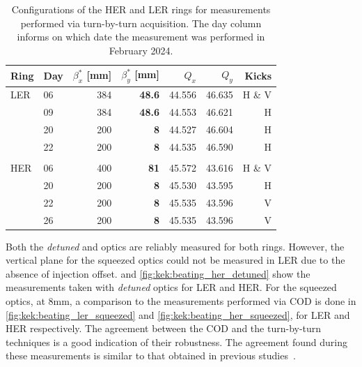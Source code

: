 \begin{table}
    \centering
    \begin{tabular}{llrrrrr}
    \hline
    Ring & Day & $\beta_x^*$ [mm] & $\beta_y^*$ [mm] & $Q_x$ & $Q_y$ & Kicks\\
    \hline
    LER        & 06 & 384 &\textbf{48.6} & 44.556 & 46.635 & H \& V \\
               & 09 & 384 &\textbf{48.6} & 44.553 & 46.621 & H  \\
               \hdashline
               & 20 & 200 & \textbf{8}   & 44.527 & 46.604 & H \\
               & 22 & 200 & \textbf{8}   & 44.535 & 46.590 & H \\
               &&&&&& \\
    HER        & 06 & 400 & \textbf{81}  & 45.572 & 43.616 & H \& V\\
               \hdashline
               & 20 & 200 & \textbf{8} & 45.530 & 43.595 & H \\
               & 22 & 200 & \textbf{8} & 45.535 & 43.596 & V \\
               & 26 & 200 & \textbf{8} & 45.535 & 43.596 & V \\
    \bottomrule
    \end{tabular}
  \caption{Configurations of the HER and LER rings for measurements performed via turn-by-turn
  acquisition. The day column informs on which date the measurement was performed in February 2024.}
  \label{tab:superkekb:configurations}
\end{table}

Both the \textit{detuned} and  optics are reliably measured for
both rings. However, the vertical plane for the squeezed optics could not be measured
in LER due to the absence of injection offset.
 and \cref{fig:kek:beating_her_detuned} show the
measurements taken with \textit{detuned} optics for LER and HER. For the squeezed optics, at 8mm, a
comparison to the measurements performed via COD is done in \cref{fig:kek:beating_ler_squeezed} and
\cref{fig:kek:beating_her_squeezed}, for LER and HER respectively.
The agreement between the COD and the turn-by-turn techniques is a good indication of their robustness. The
agreement found during these measurements is similar to that obtained in previous studies~\cite{keintzel_jacqueline_beam_2022}.



